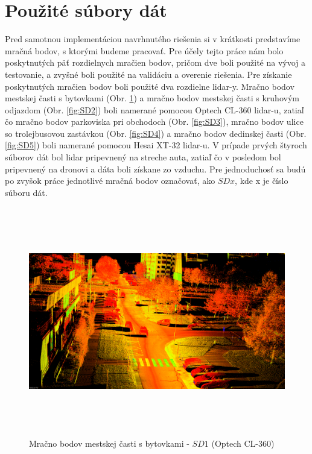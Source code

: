 \section{Použité súbory dát}
\noindent Pred samotnou implementáciou navrhnutého riešenia si v krátkosti predstavíme mračná bodov, s ktorými budeme pracovať. Pre účely tejto práce nám bolo poskytnutých päť rozdielnych mračien bodov, pričom dve boli použité na vývoj a testovanie, a zvyšné boli použité na validáciu a overenie riešenia.
\newline\indent Pre získanie poskytnutých mračien bodov boli použité dva rozdielne \acrshort{lidar}-y. Mračno bodov mestskej časti s bytovkami (Obr. \ref{fig:SD1}) a mračno bodov mestskej časti s kruhovým odjazdom (Obr. \ref{fig:SD2}) boli namerané pomocou Optech CL-360 \acrshort{lidar}-u, zatiaľ čo mračno bodov parkoviska pri obchodoch (Obr. \ref{fig:SD3}), mračno bodov ulice so trolejbusovou zastávkou (Obr. \ref{fig:SD4}) a mračno bodov dedinskej časti (Obr. \ref{fig:SD5}) boli namerané pomocou Hesai XT-32 \acrshort{lidar}-u. V prípade prvých štyroch súborov dát bol \acrshort{lidar} pripevnený na streche auta, zatiaľ čo v posledom bol pripevnený na dronovi a dáta boli získane zo vzduchu.
\newline\indent  Pre jednoduchosť sa budú po zvyšok práce jednotlivé mračná bodov označovať, ako $SDx$, kde x je číslo súboru dát.

\begin{figure}[!htbp]
  \centering
  \includegraphics[width=16cm, height=10cm]{img/SD1_example.png}
  \caption{Mračno bodov mestskej časti s bytovkami - $SD1$ (Optech CL-360)} 
  \label{fig:SD1}
\end{figure} 

